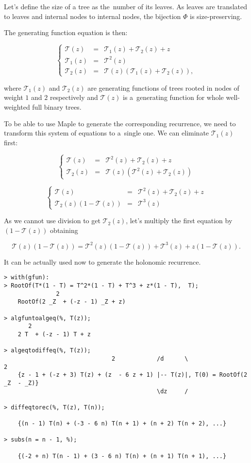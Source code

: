 \documentclass[final]{article}
\theoremstyle{definition}
\theoremstyle{definition}
\theoremstyle{remark}
\newcommand{\gf}[1]{\ensuremath{\mathcal{#1}}}
\begin{document}
Let's define the size of a tree as the~number of its leaves. As leaves are translated to leaves and internal nodes to internal nodes, the bijection \(\Phi\) is size-preserving.

The generating function equation is then:

\[\left\{\begin{array}{rcl}
            \gf{T}(z) &=& \gf{T}_1(z) + \gf{T}_2(z) + z\\
            \gf{T}_1(z) &=& \gf{T}^2(z)\\
            \gf{T}_2(z) &=& \gf{T}(z)(\gf{T}_1(z) + \gf{T}_2(z)),
\end{array}\right.\]

where \(\gf{T}_1(z)\) and \(\gf{T}_2(z)\) are generating functions of trees rooted in nodes of weight \(1\) and \(2\) respectively and \(\gf{T}(z)\) is a~generating function for whole well-weighted full binary trees.

To be able to use Maple to generate the corresponding recurrence, we need to transform this system of equations to a~single one. We can eliminate \(\gf{T}_1(z)\) first:

\[\left\{\begin{array}{rcl}
            \gf{T}(z) &=& \gf{T}^2(z) + \gf{T}_2(z) + z\\
            \gf{T}_2(z) &=& \gf{T}(z)(\gf{T}^2(z) + \gf{T}_2(z))
\end{array}\right.\]

\[\left\{\begin{array}{rcl}
            \gf{T}(z) &=& \gf{T}^2(z) + \gf{T}_2(z) + z\\
            \gf{T}_2(z)(1 - \gf{T}(z)) &=& \gf{T}^3(z)
\end{array}\right.\]

As we cannot use division to get \(\gf{T}_2(z)\), let's multiply the first equation by \((1 - \gf{T}(z))\) obtaining

\[\gf{T}(z)(1 - \gf{T}(z)) = \gf{T}^2(z)(1 - \gf{T}(z)) + \gf{T}^3(z) + z(1 - \gf{T}(z)).\]

It can be actually used now to generate the holonomic recurrence.

\begin{lstlisting}
> with(gfun):
> RootOf(T*(1 - T) = T^2*(1 - T) + T^3 + z*(1 - T),  T);
               2
    RootOf(2 _Z  + (-z - 1) _Z + z)

> algfuntoalgeq(%, T(z));
       2
    2 T  + (-z - 1) T + z

> algeqtodiffeq(%, T(z));
                               2            /d      \                   2
    {z - 1 + (-z + 3) T(z) + (z  - 6 z + 1) |-- T(z)|, T(0) = RootOf(2 _Z  - _Z)}
                                            \dz     /

> diffeqtorec(%, T(z), T(n));

    {(n - 1) T(n) + (-3 - 6 n) T(n + 1) + (n + 2) T(n + 2), ...}

> subs(n = n - 1, %);

    {(-2 + n) T(n - 1) + (3 - 6 n) T(n) + (n + 1) T(n + 1), ...}
\end{lstlisting}
\end{document}
